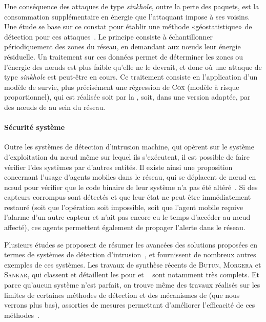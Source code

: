 Une conséquence des attaques de type \textit{sinkhole}, outre la perte des paquets, est la consommation supplémentaire en énergie que l'attaquant impose à ses voisins.
Une étude se base sur ce constat pour établir une méthode «géostatistique» de détection pour ces attaques~\cite{SKDM14}.
Le principe consiste à échantillonner périodiquement des zones du réseau, en demandant aux nœuds leur énergie résiduelle.
Un traitement sur ces données permet de déterminer les zones ou l'énergie des nœuds est plus faible qu'elle ne le devrait, et donc où une attaque de type \textit{sinkhole} est peut-être en cours.
Ce traitement consiste en l'application d'un modèle de survie, plus précisément une régression de \textsc{Cox} (modèle à risque proportionnel), qui est réalisée soit par la \sdb, soit, dans une version adaptée, par des nœuds de  au sein du réseau.

        \paragraph{Sécurité système}
Outre les systèmes de détection d'intrusion machine, qui opèrent sur le système d'exploitation du nœud même sur lequel ils s'exécutent, il est possible de faire vérifier l'\integrite des systèmes par d'autres entités.
Il existe ainsi une proposition concernant l'usage d'agents mobiles dans le réseau, qui se déplacent de nœud en nœud pour vérifier que le code binaire de leur système n'a pas été altéré~\cite{HR13}.
Si des capteurs corrompus sont détectés et que leur état ne peut être immédiatement restauré (soit que l'opération soit impossible, soit que l'agent mobile reçoive l'alarme d'un autre capteur et n'ait pas encore eu le temps d'accéder au nœud affecté), ces agents permettent également de propager l'alerte dans le réseau.

\bigskip
Plusieurs études se proposent de résumer les avancées des solutions proposées en termes de systèmes de détection d'intrusion~\cite{ME13,MS14}, et fournissent de nombreux autres exemples de ces systèmes.
Les travaux de synthèse récents de \textsc{Butun, Morgera} et \textsc{Sankar}, qui classent et détaillent les \IDS pour \manet et \rcsfs~\cite{BMS13} sont notamment très complets.
Et parce qu'aucun système \IDS n'est parfait, on trouve même des travaux réalisés sur les limites de certaines méthodes de détection et des mécanismes de  (que nous verrons plus bas), assorties de mesures permettant d'améliorer l'efficacité de ces méthodes~\cite{CQW12}.
